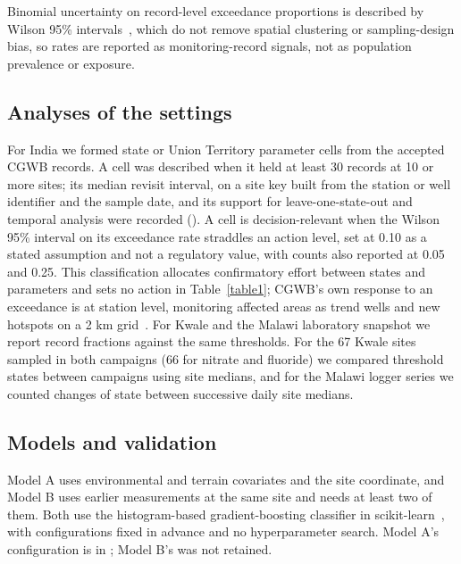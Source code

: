 \documentclass[10pt,letterpaper]{article}
\begin{document}
Binomial uncertainty on record-level exceedance proportions is described by Wilson 95\% intervals~\cite{Brown2001}, which do not remove spatial clustering or sampling-design bias, so rates are reported as monitoring-record signals, not as population prevalence or exposure.

\subsection*{Analyses of the settings}

For India we formed state or Union Territory \texttimes{} parameter cells from the accepted CGWB records. A cell was described when it held at least 30 records at 10 or more sites; its median revisit interval, on a site key built from the station or well identifier and the sample date, and its support for leave-one-state-out and temporal analysis were recorded (). A cell is decision-relevant when the Wilson 95\% interval on its exceedance rate straddles an action level, set at 0.10 as a stated assumption and not a regulatory value, with counts also reported at 0.05 and 0.25. This classification allocates confirmatory effort between states and parameters and sets no action in Table~\ref{table1}; CGWB's own response to an exceedance is at station level, monitoring affected areas as trend wells and new hotspots on a 2 km grid~\cite{CGWB-SOP-GWQDataAnalysis}. For Kwale and the Malawi laboratory snapshot we report record fractions against the same thresholds. For the 67 Kwale sites sampled in both campaigns (66 for nitrate and fluoride) we compared threshold states between campaigns using site medians, and for the Malawi logger series we counted changes of state between successive daily site medians.

\subsection*{Models and validation}

Model A uses environmental and terrain covariates and the site coordinate, and Model B uses earlier measurements at the same site and needs at least two of them. Both use the histogram-based gradient-boosting classifier in scikit-learn~\cite{Pedregosa2011}, with configurations fixed in advance and no hyperparameter search. Model A's configuration is in ; Model B's was not retained.
\end{document}
